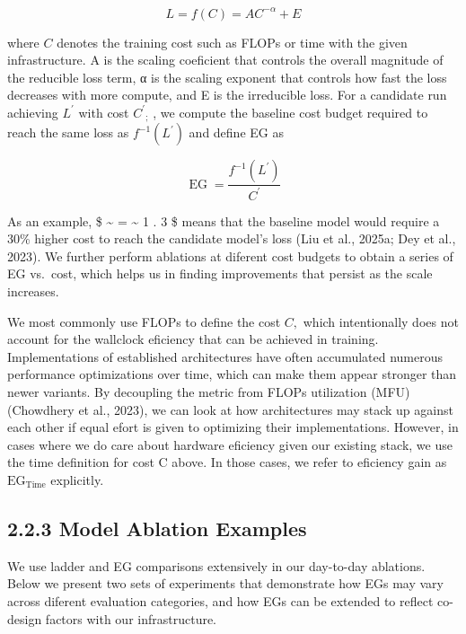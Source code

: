 \documentclass[
  10
]{article}
\begin{document}
\[
L = f ( C ) = A C ^ { - \alpha } + E\tag{1}
\]

where \(C\) denotes the training cost such as FLOPs or time with the
given infrastructure. A is the scaling coeficient that controls the
overall magnitude of the reducible loss term, α is the scaling exponent
that controls how fast the loss decreases with more compute, and E is
the irreducible loss. For a candidate run achieving \(L ^ { \prime }\)
with cost \(C ^ { \prime } { _ { ; } }\) , we compute the baseline cost
budget required to reach the same loss as
\(f ^ { - 1 } ( L ^ { \prime } )\) and define EG as

\[
\operatorname { E G } = { \frac { f ^ { - 1 } ( L ^ { \prime } ) } { C ^ { \prime } } }\tag{2}
\]

As an example, \$ \textasciitilde{} = \textasciitilde{} 1
. 3 \$ means that the baseline model would require a 30\% higher cost to
reach the candidate model's loss (Liu et al., 2025a; Dey et al., 2023).
We further perform ablations at diferent cost budgets to obtain a series
of EG vs.~cost, which helps us in finding improvements that persist as
the scale increases.

We most commonly use FLOPs to define the cost \(C ,\) which
intentionally does not account for the wallclock eficiency that can be
achieved in training. Implementations of established architectures have
often accumulated numerous performance optimizations over time, which
can make them appear stronger than newer variants. By decoupling the
metric from FLOPs utilization (MFU) (Chowdhery et al., 2023), we can
look at how architectures may stack up against each other if equal efort
is given to optimizing their implementations. However, in cases where we
do care about hardware eficiency given our existing stack, we use the
time definition for cost C above. In those cases, we refer to eficiency
gain as \(\mathrm { E G } _ { \mathrm { T i m e } }\) explicitly.

\subsection{2.2.3 Model Ablation
Examples}\label{model-ablation-examples}

We use ladder and EG comparisons extensively in our day-to-day
ablations. Below we present two sets of experiments that demonstrate how
EGs may vary across diferent evaluation categories, and how EGs can be
extended to reflect co-design factors with our infrastructure.
\end{document}
